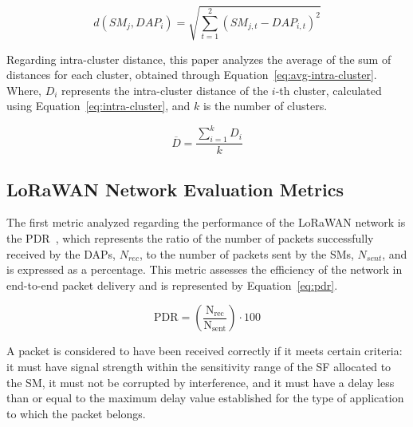 \documentclass[a4paper,fleqn]{cas-dc}
\begin{document}
\begin{equation} \label{eq:dist-euclidiana}
    d(SM_j, DAP_i) = \sqrt{\sum_{t=1}^{2} (SM_{j,t} - DAP_{i,t})^2}
\end{equation}

Regarding intra-cluster distance, this paper analyzes the average of the sum of distances for each cluster, obtained through Equation~\ref{eq:avg-intra-cluster}. Where, \( D_i \) represents the intra-cluster distance of the \( i \)-th cluster, calculated using Equation~\ref{eq:intra-cluster}, and \( k \) is the number of clusters.


\begin{equation} \label{eq:avg-intra-cluster}
    \overline{D} = \frac{\sum \limits_{i=1}^{k} D_{i}}{k}
\end{equation}

\subsection{LoRaWAN Network Evaluation Metrics}

The first metric analyzed regarding the performance of the \gls{LoRaWAN} network is the \gls{PDR}~\cite{magrin2020lora}, which represents the ratio of the number of packets successfully received by the \gls{DAPs}, \( N_{rec} \), to the number of packets sent by the \gls{SMs}, \( N_{sent} \), and is expressed as a percentage. This metric assesses the efficiency of the network in end-to-end packet delivery and is represented by Equation~\ref{eq:pdr}.

\begin{equation} \label{eq:pdr}
    \text{PDR} = \left( \frac{\text{N}_{\text{rec}}}{\text{N}_{\text{sent}}} \right) \cdot 100
\end{equation}

A packet is considered to have been received correctly if it meets certain criteria: it must have signal strength within the sensitivity range of the \gls{SF} allocated to the SM, it must not be corrupted by interference, and it must have a delay less than or equal to the maximum delay value established for the type of application to which the packet belongs.
\end{document}
